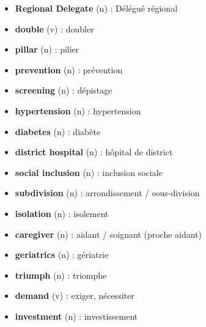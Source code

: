 \documentclass[11pt]{article}
\begin{document}
\begin{aretenir}
\begin{itemize}
    \item \textbf{Regional Delegate} (n) : Délégué régional
    \item \textbf{double} (v) : doubler
    \item \textbf{pillar} (n) : pilier
    \item \textbf{prevention} (n) : prévention
    \item \textbf{screening} (n) : dépistage
    \item \textbf{hypertension} (n) : hypertension
    \item \textbf{diabetes} (n) : diabète
    \item \textbf{district hospital} (n) : hôpital de district
    \item \textbf{social inclusion} (n) : inclusion sociale
    \item \textbf{subdivision} (n) : arrondissement / sous-division
    \item \textbf{isolation} (n) : isolement
    \item \textbf{caregiver} (n) : aidant / soignant (proche aidant)
    \item \textbf{geriatrics} (n) : gériatrie
    \item \textbf{triumph} (n) : triomphe
    \item \textbf{demand} (v) : exiger, nécessiter
    \item \textbf{investment} (n) : investissement
\end{itemize}
\end{aretenir}
\end{document}

